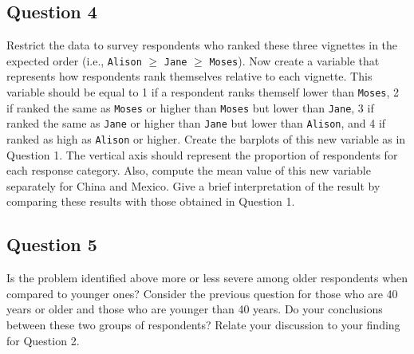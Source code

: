 \documentclass[]{article}
\begin{document}
\subsection{Question 4}\label{question-4}

Restrict the data to survey respondents who ranked these three vignettes
in the expected order (i.e., \texttt{Alison} $\ge$ \texttt{Jane} $\ge$
\texttt{Moses}). Now create a variable that represents how respondents
rank themselves relative to each vignette. This variable should be equal
to 1 if a respondent ranks themself lower than \texttt{Moses}, 2 if
ranked the same as \texttt{Moses} or higher than \texttt{Moses} but
lower than \texttt{Jane}, 3 if ranked the same as \texttt{Jane} or
higher than \texttt{Jane} but lower than \texttt{Alison}, and 4 if
ranked as high as \texttt{Alison} or higher. Create the barplots of this
new variable as in Question 1. The vertical axis should represent the
proportion of respondents for each response category. Also, compute the
mean value of this new variable separately for China and Mexico. Give a
brief interpretation of the result by comparing these results with those
obtained in Question 1.

\subsection{Question 5}\label{question-5}

Is the problem identified above more or less severe among older
respondents when compared to younger ones? Consider the previous
question for those who are 40 years or older and those who are younger
than 40 years. Do your conclusions between these two groups of
respondents? Relate your discussion to your finding for Question 2.
\end{document}
